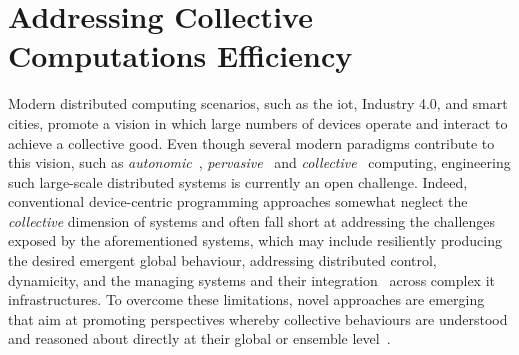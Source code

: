 
\newcommand{\export}{export}
\newcommand{\round}{round}
\newcommand{\RS}{\mathcal{S}}
\newcommand{\RA}{\mathcal{A}}
\newcommand{\RP}{\mathcal{P}}
\newcommand{\RR}{\mathcal{R}}
\newcommand{\RE}{\mathbb{E}}
\newcommand{\decision}[1]{{\color{red} #1}}
\newcommand{\mtext}[1]{\text{\texttt{#1}}}
\newcommand{\revision}[1]{{#1}}
\newenvironment{iequation}{\(}{\). }
\def\tablename{Table}
\sloppypar

\newcommand{\scafiinline}[1]{\lstinline[language=scafi]$#1$}


\chapter{Addressing Collective Computations Efficiency}
\minitoc%


\lstset{language=scafi}

Modern distributed computing scenarios, such as the \ac{iot}, Industry 4.0, and smart cities, promote a vision in which large numbers of devices operate and interact to achieve a collective good.
%
Even though several modern paradigms contribute to this vision, such as \emph{autonomic}~\cite{DBLP:journals/computer/KephartC03}, \emph{pervasive}~\cite{DBLP:journals/wc/Satyanarayanan01} and \emph{collective}~\cite{DBLP:journals/computer/Abowd16} computing, engineering such large-scale distributed systems is currently an open challenge. 
%
Indeed, conventional device-centric programming approaches somewhat neglect the \emph{collective} dimension of systems and often fall short at addressing the challenges exposed by the aforementioned systems, which may include resiliently producing the desired emergent global behaviour, 
addressing distributed control, dynamicity, and the managing systems and their integration~\cite{DBLP:journals/fgcs/BellmanBDEGLLNP21} across complex \ac{it} infrastructures.
%
To overcome these limitations, novel approaches are emerging that aim at promoting perspectives whereby collective behaviours are understood and reasoned about directly at their global or ensemble level~\cite{DBLP:journals/sttt/NicolaJW20,DBLP:conf/birthday/BucchiaroneM19,DBLP:journals/sttt/BuresGHPKVK20,DBLP:journals/jlap/ViroliBDACP19}.

